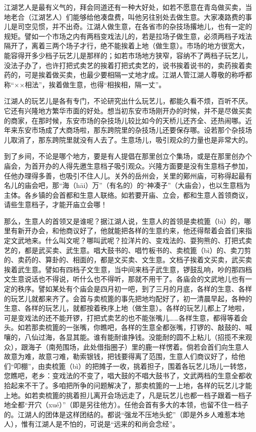 \documentclass[12pt,UTF8]{ctexbook}
\begin{document}
江湖艺人是最有义气的，拜会同道还有一种大好处，如若不愿意在青岛做买卖，当地老合（江湖艺人）们能够给他凑盘费，叫他另往别处去做生意。大家凑路费的事儿是司空见惯，并不出奇。江湖人做生意，在各省市的杂技场撂地儿，也有一定的规矩。譬如一个市场之内有两档变戏法儿的，若是拉场子做生意，必须两档子戏法隔开了，离着三两个场子才行，绝不能挨着上地（做生意）。市场的地方很宽大，能容得开多少档子玩艺儿是那样的；如若市场地方狭窄，容纳不了两档子玩艺儿，没法子办了，也许打把式卖艺的挨着打把式卖艺的，说书挨着说书的，卖药挨着卖药的，可是挨着做买卖，也最少要相隔一丈地才成。江湖人管江湖人尊敬的称呼都称“××相法”，挨着做生意，也得“相挨相，隔一丈”。

江湖人的玩艺儿是各有专门，不论研究出什么玩艺儿，都能久看不烦，百听不厌。它还有兴隆地方繁华市面的好处。想当初东安市场刚开办的时候，并不是尽做买卖的商家，在那时候，东安市场的杂技场儿较比如今的天桥儿还齐全、还热闹哪。近年来东安市场成了大商场啦，那东跨院里的杂技场儿还要保存哪。设若那个杂技场儿取消了，那东跨院里就没有人去了。生意场儿，吸引观众的力量也是非常大的。

到了乡间，不论是哪个地方，要是有人提倡在那里创立个集场，或是在那里创办个庙会，为首开办的人得先邀生意档子吸引观众。兴隆方面要是没有生意档子参加，任他办理得多善，也吸引不住人儿。关外的岳州会，关里的鄚州庙，可称得起最有名儿的庙会吧，那“海（hāi）万”（有名的）的“神凑子”（大庙会），也以生意档为主体。各乡镇的会首都和生意人联络。如若要开庙、立会，都和生意人首领商议，请些生意档子，才能开庙立会哪！

那么，生意人的首领又是谁呢？据江湖人说，生意人的首领是卖梳篦（bì）的，哪里有新开办会，和他商议好了，他就能把各样的生意约来，他还得帮着会首们来指定文武地来。什么叫文呢？哪叫武呢？拉洋片的、变戏法的、耍狗熊的、打把式卖艺的，都是武买卖、武生意。唱大鼓书的、唱竹板书的、卖梳篦（bì）的、卖刀剪的、卖药的、算卦的、相面的，都是文买卖、文生意。文档子挨着文买卖，武买卖挨着武生意。譬如有四档子文生意，当中间来档子武生意，锣鼓乱响，吵的那四档文生意说话也不得说，听什么也不得听，那就不用干了。各庙会的文武地儿也有一定的秩序。譬如某处有个庙会是四月初一吧，到了三月的月底，各样的生意、各样的玩艺儿就都来齐了。会首与卖梳篦的事先把地均配好了，初一清晨早起，各种的生意、各样的玩艺儿，就都按着秩序上地（做生意）。各样的玩艺儿都上了地啦，可是变戏法的还不能开锣，打把式卖艺的也不能张嘴儿……各样生意，都得等着会头。如若那卖梳篦的一张嘴，你瞧吧，各样的生意全都张嘴，打锣的、敲鼓的、喊嚷的，八仙过海，各显其能。谁有能耐谁挣钱。没能耐的圆不上粘儿（招揽不来观众），跟海子（南苑围场，此处借指圈子）里的鹿一样愣着。倘若会首们向生意人故意为难，故意刁难，勒索银钱，把钱要得离了范围，生意人们商议好了，给他们“叩棚”，由卖梳篦（bì）的把摊子一收，挑着担子，围着各玩艺儿场儿一转悠，您瞧吧，老乡：变戏法的不变了，唱大鼓的不唱大鼓书了，文武两档的生意全都收拾起来不干了。多咱把所争的问题解决了，那卖梳篦的一上地，各样的玩艺儿才能上地。如若卖梳篦的挑着担儿离开会场远走了，凡是玩艺儿也都一档子跟着一档子地全都“开穴（xué）”（即是另往他方）。任他会首有多大的本领，也留不住一档子的。江湖人的团体是这样团结的。都说“强龙不压地头蛇”（即是外乡人难惹本地人），惟有江湖人是不怕的，可说是“远来的和尚会念经”。
\end{document}
